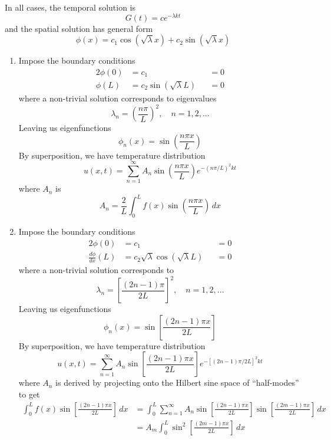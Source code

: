 \documentclass[a4paper]{article}
\begin{document}
In all cases, the temporal solution is
\[
	G \!\left( t \right) = ce^{-\lambda kt} 
\]
and the spatial solution has general form
\[
	\phi \!\left( x \right) = c_{1}\cos\!\left(\sqrt{\lambda}x\right) + c_{2}\sin\!\left(\sqrt{\lambda}x\right) 
\]
\begin{enumerate}[label=(\alph*)]
	\item Impose the boundary conditions
	\begin{alignat*}{2}
		\phi \!\left( 0 \right) & = c_{1} && = 0 \\
		\phi \!\left( L \right) & = c_{2}\sin\!\left(\sqrt{\lambda}L\right) && = 0
	\end{alignat*}
	where a non-trivial solution corresponds to eigenvalues
	\[
		\lambda_{n} = \!\left( \frac{n \pi}{L} \right)^{2}, \quad n = 1, 2, ...
	\]
	Leaving us eigenfunctions
	\[
		\phi_{n}\!\left( x \right) = \sin\!\left(\frac{n \pi x}{L}\right)
	\]
	By superposition, we have temperature distribution
	\[
		u \!\left( x,t \right) = \sum^{\infty}_{n=1} A_{n}\sin\!\left(\frac{n \pi x}{L}\right)e^{-\!\left( n \pi / L \right)^{2}kt} 
	\]
	where \( A_{n} \) is
	\[
		A_{n} = \frac{2}{L}\int^{L}_{0} f \!\left( x \right)\sin\!\left(\frac{n \pi x}{L}\right) \, dx  
	\]
	\item Impose the boundary conditions
	\begin{alignat*}{2}
		\phi \!\left( 0 \right) & = c_{1} && = 0 \\
		\frac{d \phi}{d x}\!\left( L \right) & = c_{2}\sqrt{\lambda}\cos\!\left(\sqrt{\lambda}L\right) && = 0
	\end{alignat*}
	where a non-trivial solution corresponds to
	\[
		\lambda_{n} = \!\left[ \frac{\!\left( 2n - 1 \right)\pi}{2L} \right]^{2}, \quad n = 1, 2, ...
	\]
	Leaving us eigenfunctions
	\[
		\phi_{n}\!\left( x \right) = \sin\!\left[\frac{\!\left( 2n - 1 \right)\pi x}{2L}\right] 
	\]
	By superposition, we have temperature distribution
	\[
		u \!\left( x,t \right) = \sum^{\infty}_{n=1} A_{n}\sin\!\left[\frac{\!\left( 2n - 1 \right)\pi x}{2L}\right]e^{-\!\left[ \!\left( 2n - 1 \right)\pi / 2L \right]^{2}kt} 
	\]
	where \( A_{n} \) is derived by projecting onto the Hilbert sine space of ``half-modes'' to get
	\begin{align*}
		\int^{L}_{0} f \!\left( x \right)\sin\!\left[\frac{\!\left( 2n - 1 \right)\pi x}{2L}\right] \, dx & = \int^{L}_{0} \sum^{\infty}_{n=1} A_{n}\sin\!\left[\frac{\!\left( 2n - 1 \right)\pi x}{2L}\right]\sin\!\left[\frac{\!\left( 2m - 1 \right)\pi x}{2L}\right] \, dx \\ 
														  & = A_{m}\int^{L}_{0} \sin^{2}\!\left[\frac{\!\left( 2m - 1 \right)\pi x}{2L}\right] \, dx \\

\end{align*}
\end{enumerate}
\end{document}
